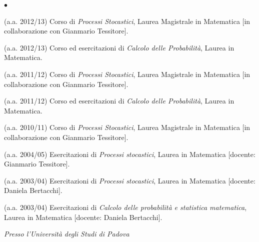 \documentclass[a4paper,11pt,oneside]{amsart}
\newenvironment{myitemize}{%
\begin{list}{$\bullet$}%
 	{%
	\setlength{\itemsep}{0.3em}%
	\setlength{\topsep}{0.3em}%
	\setlength{\partopsep}{0em}%
	\setlength{\parsep}{0em}%
	\setlength{\parskip}{0em}%
	\setlength\leftmargin{1.5em}%
	\setlength\labelwidth{1.1em}%
	\setlength{\labelsep}{0.4em}%
	}%
	}%
{\end{list}}
\renewenvironment{itemize}{
\begin{myitemize}}%
{\end{myitemize}}
\begin{document}
\begin{itemize}
\item (a.a. 2012/13)
Corso di \textit{Processi Stocastici},
Laurea Magistrale in Matematica
[in collaborazione con Gianmario Tessitore].

\item (a.a. 2012/13)
Corso ed esercitazioni di \textit{Calcolo delle Probabilità},
Laurea in Matematica.

\item (a.a. 2011/12)
Corso di \textit{Processi Stocastici},
Laurea Magistrale in Matematica
[in collaborazione con Gianmario Tessitore].

\item (a.a. 2011/12)
Corso ed esercitazioni di \textit{Calcolo delle Probabilità},
Laurea in Matematica.

\item (a.a. 2010/11)
Corso di \textit{Processi Stocastici},
Laurea Magistrale in Matematica
[in collaborazione con Gianmario Tessitore].

\item (a.a. 2004/05) Esercitazioni di \textit{Processi stocastici},
Laurea in Matematica
[docente: Gianmario Tessitore].

\item (a.a. 2003/04) Esercitazioni di \textit{Processi stocastici},
Laurea in Matematica
[docente: Daniela Bertacchi].

\item (a.a. 2003/04)
Esercitazioni di \textit{Calcolo delle probabilità e statistica matematica},
Laurea in Matematica
[docente: Daniela Bertacchi].
\end{itemize}


\smallskip
\emph{Presso l'Università degli Studi di Padova}
\end{document}
